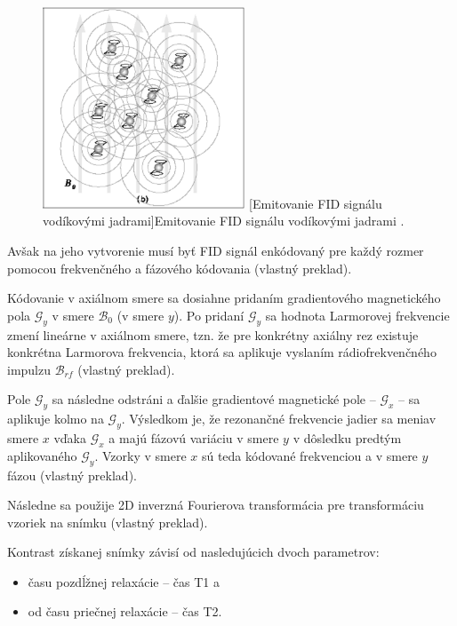 \begin {figure}[H]
        \centering
        \includegraphics[height=6cm]{media/hydrogen/hydrogen_emitting_rf.png}
        \captionsetup{justification=centering}
        [Emitovanie FID signálu vodíkovými jadrami]{Emitovanie FID signálu vodíkovými jadrami \cite{basic_principles_of_mri}.}
\end {figure}

Avšak na jeho vytvorenie musí byť FID signál enkódovaný pre každý rozmer pomocou frekvenčného a fázového kódovania \cite{basic_principles_of_mri} (vlastný preklad).

Kódovanie v axiálnom smere sa dosiahne pridaním gradientového magnetického pola $\mathcal{G}_{y}$ v smere $\mathcal{B}_{0}$ (v smere $y$). Po pridaní $\mathcal{G}_{y}$ sa hodnota Larmorovej frekvencie zmení lineárne v axiálnom smere, tzn. že pre konkrétny axiálny rez existuje konkrétna Larmorova frekvencia, ktorá sa aplikuje vyslaním rádiofrekvenčného impulzu $\mathcal{B}_{rf}$ \cite{basic_principles_of_mri} (vlastný preklad).

Pole $\mathcal{G}_{y}$ sa následne odstráni a ďalšie gradientové magnetické pole -- $\mathcal{G}_{x}$ -- sa aplikuje kolmo na $\mathcal{G}_{y}$. Výsledkom je, že rezonančné frekvencie jadier sa menia\newline v smere $x$ vďaka $\mathcal{G}_{x}$ a majú fázovú variáciu v smere $y$ v dôsledku predtým aplikovaného $\mathcal{G}_{y}$. Vzorky v smere $x$ sú teda kódované frekvenciou a v smere $y$ fázou \cite{basic_principles_of_mri} (vlastný preklad).

Následne sa použije 2D inverzná Fourierova transformácia pre transformáciu vzoriek na snímku \cite{basic_principles_of_mri} (vlastný preklad).\clearpage

Kontrast získanej snímky závisí od nasledujúcich dvoch parametrov:

\begin {itemize}
\item {času pozdĺžnej relaxácie -- čas T1 a}
\item {od času priečnej relaxácie -- čas T2.}
\end {itemize}

